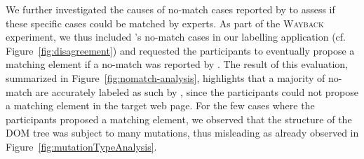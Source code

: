 \begin{table}[h]
    \caption{Confusion matrix on the \textsc{Wayback} dataset.}\label{tab:labels}
    \centering
\end{table}

We further investigated the causes of \textsf{no-match} cases reported by \erratum{} to assess if these specific cases could be matched by experts.
As part of the \textsc{Wayback} experiment, we thus included \erratum's \textsf{no-match} cases in our labelling application (cf. Figure~\ref{fig:disagreement}) and requested the participants to eventually propose a matching element if a \textsf{no-match} was reported by \erratum{}.
The result of this evaluation, summarized in Figure~\ref{fig:nomatch-analysis}, highlights that a majority of \textsf{no-match} are accurately labeled as such by \erratum{}, since the participants could not propose a matching element in the target web page. 
For the few cases where the participants proposed a matching element, we observed that the structure of the DOM tree was subject to many mutations, thus misleading \erratum{} as already observed in Figure~\ref{fig:mutationTypeAnalysis}.

